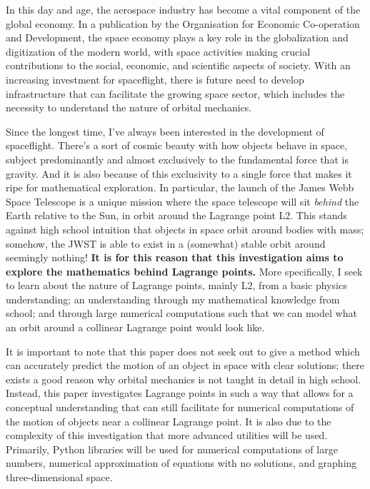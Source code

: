 In this day and age, the aerospace industry has become a vital component of the global economy.
In a publication by the Organisation for Economic Co-operation and Development, the space economy plays a key role in the globalization and digitization of the modern world, with space activities making crucial contributions to the social, economic, and scientific aspects of society\autocite{c5996201-en}.
With an increasing investment for spaceflight, there is future need to develop infrastructure that can facilitate the growing space sector, which includes the necessity to understand the nature of orbital mechanics.

Since the longest time, I've always been interested in the development of spaceflight.
There's a sort of cosmic beauty with how objects behave in space, subject predominantly and almost exclusively to the fundamental force that is gravity.
And it is also because of this exclusivity to a single force that makes it ripe for mathematical exploration.
In particular, the launch of the James Webb Space Telescope is a unique mission where the space telescope will sit \textit{behind} the Earth relative to the Sun, in orbit around the Lagrange point L2.
This stands against high school intuition that objects in space orbit around bodies with mass; somehow, the JWST is able to exist in a (somewhat) stable orbit around seemingly nothing!
\textbf{It is for this reason that this investigation aims to explore the mathematics behind Lagrange points.}
More specifically, I seek to learn about the nature of Lagrange points, mainly L2, from a basic physics understanding; an understanding through my mathematical knowledge from school; and through large numerical computations such that we can model what an orbit around a collinear Lagrange point would look like.

It is important to note that this paper does not seek out to give a method which can accurately predict the motion of an object in space with clear solutions; there exists a good reason why orbital mechanics is not taught in detail in high school.
Instead, this paper investigates Lagrange points in such a way that allows for a conceptual understanding that can still facilitate for numerical computations of the motion of objects near a collinear Lagrange point.
It is also due to the complexity of this investigation that more advanced utilities will be used.
Primarily, Python libraries will be used for numerical computations of large numbers, numerical approximation of equations with no solutions, and graphing three-dimensional space.
